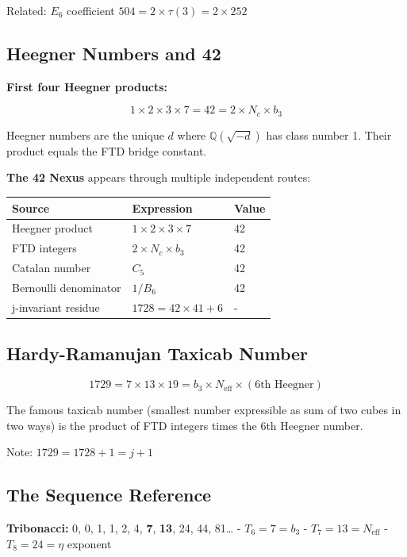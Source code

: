 \documentclass[
  11pt,
  letterpaper,
  twoside,
  openany]{book}
\makeatletter
\let\orig@subsection\subsection
\renewcommand{\subsection}{\needspace{6\baselineskip}\orig@subsection}
\makeatother
\begin{document}
Related: \(E_6\) coefficient \(504 = 2 \times \tau(3) = 2 \times 252\)

\subsection{Heegner Numbers and 42}\label{heegner-numbers-and-42}

\textbf{First four Heegner products:}

\[1 \times 2 \times 3 \times 7 = 42 = 2 \times N_c \times b_3\]

Heegner numbers are the unique \(d\) where \(\mathbb{Q}(\sqrt{-d})\) has
class number 1. Their product equals the FTD bridge constant.

\textbf{The 42 Nexus} appears through multiple independent routes:

\begin{longtable}[]{@{}lll@{}}
\toprule\noalign{}
Source & Expression & Value \\
\midrule\noalign{}
\endhead
\bottomrule\noalign{}
\endlastfoot
Heegner product & \(1 \times 2 \times 3 \times 7\) & 42 \\
FTD integers & \(2 \times N_c \times b_3\) & 42 \\
Catalan number & \(C_5\) & 42 \\
Bernoulli denominator & \(1/B_6\) & 42 \\
j-invariant residue & \(1728 = 42 \times 41 + 6\) & - \\
\end{longtable}

\subsection{Hardy-Ramanujan Taxicab
Number}\label{hardy-ramanujan-taxicab-number}

\[1729 = 7 \times 13 \times 19 = b_3 \times N_{\text{eff}} \times (\text{6th Heegner})\]

The famous taxicab number (smallest number expressible as sum of two
cubes in two ways) is the product of FTD integers times the 6th Heegner
number.

Note: \(1729 = 1728 + 1 = j + 1\)

\subsection{The Sequence Reference}\label{the-sequence-reference}

\textbf{Tribonacci:} 0, 0, 1, 1, 2, 4, \textbf{7}, \textbf{13}, 24, 44,
81\ldots{} - \(T_6 = 7 = b_3\) - \(T_7 = 13 = N_{\text{eff}}\) -
\(T_8 = 24 = \eta\) exponent
\end{document}
